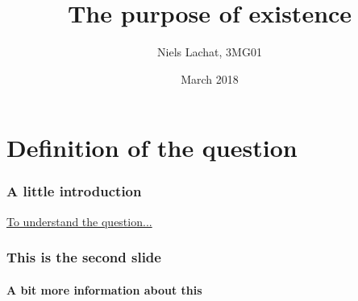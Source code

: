 \documentclass{beamer}
\title{The purpose of existence}
\author{Niels Lachat, 3MG01}
\date{March 2018}
\begin{document}
	\maketitle
	
	\tableofcontents
	
	\section{Definition of the question}	
	
	\begin{frame}
		\frametitle{A little introduction}
		\href{../orig.gif}{To understand the question...}
    \end{frame}
  \begin{frame}
    \frametitle{This is the second slide}
    \framesubtitle{A bit more information about this}
  \end{frame}
\end{document}
